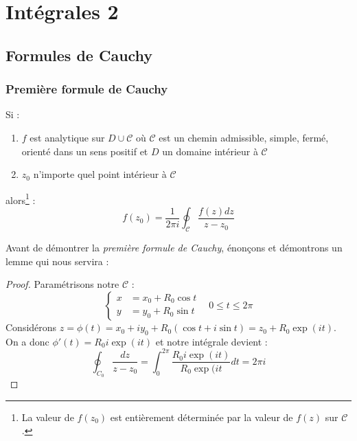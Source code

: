 \chapter{Intégrales 2}
\section{Formules de Cauchy}
    \subsection{Première formule de Cauchy}
    Si :
    \begin{enumerate}
    \item $f$ est analytique sur $D \cup \mathcal{C}$ où $\mathcal{C}$ est un chemin admissible,
    simple, fermé, orienté dans un sens positif et $D$ un domaine intérieur à $\mathcal{C}$
    \item $z_0$ n'importe quel point intérieur à $\mathcal{C}$
    \end{enumerate}
    alors\footnote{La valeur de $f(z_0)$ est entièrement déterminée par la valeur de $f(z)$ sur
    $\mathcal{C}$.} :
    \begin{equation}
    f(z_0) = \dfrac{1}{2\pi i}\oint_\mathcal{C}\dfrac{f(z)dz}{z-z_0}
    \end{equation}
    
    Avant de démontrer la \textit{première formule de Cauchy}, énonçons et démontrons un lemme
    qui nous servira :\\
    
    \begin{proof}
    Paramétrisons notre $\mathcal{C}$ :
    \begin{equation}
    \left\{\begin{array}{ll}
    x &= x_0 + R_0\cos t  \\
    y &= y_0 + R_0\sin t 
    \end{array}\right.\ \ \ \ 0 \leq t \leq 2\pi
    \end{equation}
    Considérons $z = \phi(t) = x_0 + iy_0 + R_0(\cos t + i \sin t) = z_0 + R_0\exp(it)$. On a
    donc $\phi'(t) = R_0 i\exp(it)$ et notre intégrale devient :
    \begin{equation}
    \oint_{C_0} \dfrac{dz}{z-z_0} = \int_0^{2\pi} \dfrac{R_0 i \exp(it)}{R_0\exp(it}dt = 2\pi i
    \end{equation}
    \end{proof}

